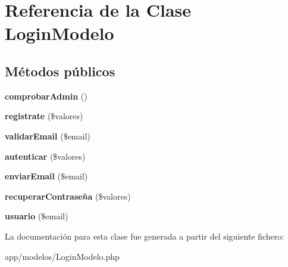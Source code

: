 \hypertarget{classLoginModelo}{}\section{Referencia de la Clase Login\+Modelo}
\label{classLoginModelo}
\subsection*{Métodos públicos}
\begin{DoxyCompactItemize}
\item 
\mbox{\label{classLoginModelo_a5a5904fc50ce1f22e17f2d2db7d614d5}} 
{\bfseries comprobar\+Admin} ()
\item 
\mbox{\label{classLoginModelo_a1207c5872ee96488bcf809bd146e86b0}} 
{\bfseries registrate} (\$valores)
\item 
\mbox{\label{classLoginModelo_a2b8570b468400c212352599c435052a4}} 
{\bfseries validar\+Email} (\$email)
\item 
\mbox{\label{classLoginModelo_ae5fd90fa01327e7ac68ed94192f6e08c}} 
{\bfseries autenticar} (\$valores)
\item 
\mbox{\label{classLoginModelo_a65df6f2375266b5e65fc7670ad6ea7e6}} 
{\bfseries enviar\+Email} (\$email)
\item 
\mbox{\label{classLoginModelo_a3abf22eab2ae1a3c5b2a5be84017a5f0}} 
{\bfseries recuperar\+Contraseña} (\$valores)
\item 
\mbox{\label{classLoginModelo_a3af53cec9534c05f9a1b2569e424e7e1}} 
{\bfseries usuario} (\$email)
\end{DoxyCompactItemize}


La documentación para esta clase fue generada a partir del siguiente fichero\+:\begin{DoxyCompactItemize}
\item 
app/modelos/Login\+Modelo.\+php\end{DoxyCompactItemize}
